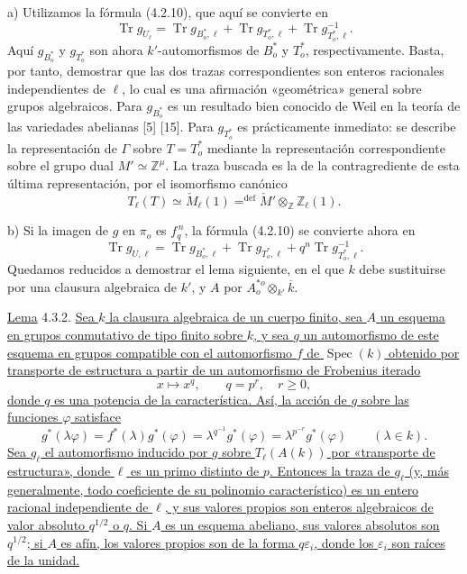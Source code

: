 \smallskip
\noindent
a) Utilizamos la fórmula (4.2.10), que aquí se convierte en
\begin{equation}\tag{4.3.0}
 \operatorname{Tr}g_{U_\ell}
 =\operatorname{Tr}g_{B^*_o,\ell}
 +\operatorname{Tr}g_{T^*_o,\ell}
 +\operatorname{Tr}g^{-1}_{T^*_o,\ell}.
\end{equation}
Aquí $g_{B^*_o}$ y $g_{T^*_o}$ son ahora $k'$-automorfismos de $B^*_o$
y $T^*_o$, respectivamente. Basta, por tanto, demostrar que las dos
trazas correspondientes son enteros racionales independientes de
$\ell$, lo cual es una afirmación «geométrica» general sobre grupos
algebraicos. Para $g_{B^*_o}$ es un resultado bien conocido de Weil en
la teoría de las variedades abelianas [5] [15]. Para $g_{T^*_o}$ es
prácticamente inmediato: se describe la representación de $\Gamma$
sobre $T=T^*_o$ mediante la representación correspondiente sobre el
grupo dual $M'\simeq\mathbb Z^\mu$. La traza buscada es la de la
contragrediente de esta última representación, por el isomorfismo
canónico
\[
 T_\ell(T)\simeq\check M_\ell(1)
 \mathrel{\mathop{=}^{\mathrm{def}}}
 \check M'\otimes_{\mathbb Z}\mathbb Z_\ell(1).
\]

\smallskip
\noindent
b) Si la imagen de $g$ en $\pi_o$ es $f_q^{\,n}$, la fórmula (4.2.10)
se convierte ahora en
\begin{equation}\tag{4.3.1}
 \operatorname{Tr}g_{U,\ell}
 =\operatorname{Tr}g_{B^*_o,\ell}
 +\operatorname{Tr}g_{T^*_o,\ell}
 +q^n\operatorname{Tr}g^{-1}_{T^*_o,\ell}.
\end{equation}
Quedamos reducidos a demostrar el lema siguiente, en el que $k$ debe
sustituirse por una clausura algebraica de $k'$, y $A$ por
$A^{*o}_o\otimes_{k'}\overline k$.

\medskip
\noindent
\underline{Lema} 4.3.2. \underline{Sea $k$ la clausura algebraica de
un cuerpo finito, sea $A$ un esquema en grupos conmutativo de tipo
finito sobre $k$, y sea $g$ un automorfismo de este esquema en grupos
compatible con el automorfismo $f$ de $\operatorname{Spec}(k)$ obtenido
por transporte de estructura a partir de un automorfismo de Frobenius
iterado}
\[
 x\longmapsto x^q,
 \qquad q=p^r,\quad r\geq0,
\]
\underline{donde $q$ es una potencia de la característica. Así, la
acción de $g$ sobre las funciones $\varphi$ satisface}
\[
 g^*(\lambda\varphi)=f^*(\lambda)g^*(\varphi)
 =\lambda^{q^{-1}}g^*(\varphi)
 =\lambda^{p^{-r}}g^*(\varphi)
 \qquad(\lambda\in k).
\]
\underline{Sea $g_\ell$ el automorfismo inducido por $g$ sobre
$T_\ell(A(k))$ por «transporte de estructura», donde $\ell$ es un primo
distinto de $p$. Entonces la traza de $g_\ell$ (y, más generalmente,
todo coeficiente de su polinomio característico) es un entero racional
independiente de $\ell$, y sus valores propios son enteros algebraicos
de valor absoluto $q^{1/2}$ o $q$. Si $A$ es un esquema abeliano, sus
valores absolutos son $q^{1/2}$; si $A$ es afín, los valores propios son
de la forma $q\varepsilon_i$, donde los $\varepsilon_i$ son raíces de
la unidad.}

